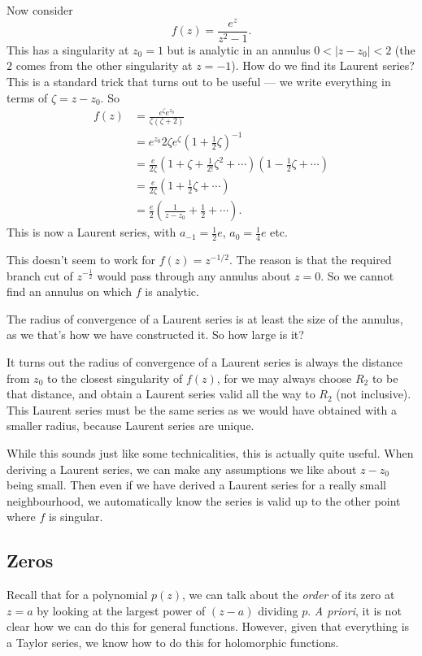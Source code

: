 \documentclass[a4paper]{article}
\begin{document}
\begin{eg}
  Now consider
  \[
    f(z) = \frac{e^z}{z^2 - 1}.
  \]
  This has a singularity at $z_0 = 1$ but is analytic in an annulus $0 < |z - z_0| < 2$ (the $2$ comes from the other singularity at $z =-1$). How do we find its Laurent series? This is a standard trick that turns out to be useful --- we write everything in terms of $\zeta = z - z_0$. So
  \begin{align*}
    f(z) &= \frac{e^\zeta e^{z_0}}{\zeta(\zeta + 2)} \\
    &= e^{z_0}{2\zeta} e^{\zeta} \left(1 + \frac{1}{2}\zeta\right)^{-1}\\
    &= \frac{e}{2 \zeta} \left(1 + \zeta + \frac{1}{2!}\zeta^2 + \cdots\right)\left(1 - \frac{1}{2}\zeta + \cdots\right)\\
    &= \frac{e}{2\zeta} \left(1 + \frac{1}{2}\zeta + \cdots\right)\\
    &= \frac{e}{2}\left(\frac{1}{z - z_0} + \frac{1}{2} + \cdots\right).
  \end{align*}
  This is now a Laurent series, with $a_{-1} = \frac{1}{2}e$, $a_0 = \frac{1}{4}e$ etc.
\end{eg}

\begin{eg}
  This doesn't seem to work for $f(z) = z^{-1/2}$. The reason is that the required branch cut of $z^{-\frac{1}{2}}$ would pass through any annulus about $z = 0$. So we cannot find an annulus on which $f$ is analytic.
\end{eg}

The radius of convergence of a Laurent series is at least the size of the annulus, as we that's how we have constructed it. So how large is it?

It turns out the radius of convergence of a Laurent series is always the distance from $z_0$ to the closest singularity of $f(z)$, for we may always choose $R_2$ to be that distance, and obtain a Laurent series valid all the way to $R_2$ (not inclusive). This Laurent series must be the same series as we would have obtained with a smaller radius, because Laurent series are unique.

While this sounds just like some technicalities, this is actually quite useful. When deriving a Laurent series, we can make any assumptions we like about $z - z_0$ being small. Then even if we have derived a Laurent series for a really small neighbourhood, we automatically know the series is valid up to the other point where $f$ is singular.

\subsection{Zeros}
Recall that for a polynomial $p(z)$, we can talk about the \emph{order} of its zero at $z = a$ by looking at the largest power of $(z - a)$ dividing $p$. \emph{A priori}, it is not clear how we can do this for general functions. However, given that everything is a Taylor series, we know how to do this for holomorphic functions.
\end{document}
